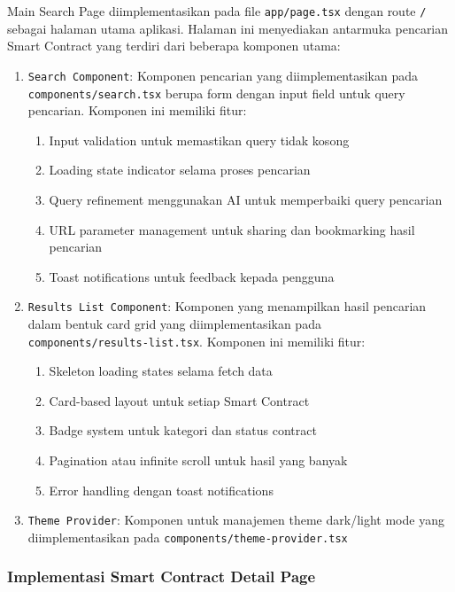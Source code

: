 Main Search Page diimplementasikan pada file \texttt{app/page.tsx} dengan route \texttt{/} sebagai halaman utama aplikasi. Halaman ini menyediakan antarmuka pencarian Smart Contract yang terdiri dari beberapa komponen utama:

\begin{enumerate}
	\item \texttt{Search Component}: Komponen pencarian yang diimplementasikan pada \texttt{components/search.tsx} berupa form dengan input field untuk query pencarian. Komponen ini memiliki fitur:
	      \begin{enumerate}
		      \item Input validation untuk memastikan query tidak kosong
		      \item Loading state indicator selama proses pencarian
		      \item Query refinement menggunakan AI untuk memperbaiki query pencarian
		      \item URL parameter management untuk sharing dan bookmarking hasil pencarian
		      \item Toast notifications untuk feedback kepada pengguna
	      \end{enumerate}
	\item \texttt{Results List Component}: Komponen yang menampilkan hasil pencarian dalam bentuk card grid yang diimplementasikan pada \\\texttt{components/results-list.tsx}. Komponen ini memiliki fitur:
	      \begin{enumerate}
		      \item Skeleton loading states selama fetch data
		      \item Card-based layout untuk setiap Smart Contract
		      \item Badge system untuk kategori dan status contract
		      \item Pagination atau infinite scroll untuk hasil yang banyak
		      \item Error handling dengan toast notifications
	      \end{enumerate}
	\item \texttt{Theme Provider}: Komponen untuk manajemen theme dark/light mode yang diimplementasikan pada \texttt{components/theme-provider.tsx}
\end{enumerate}

\subsubsection{Implementasi Smart Contract Detail Page}


